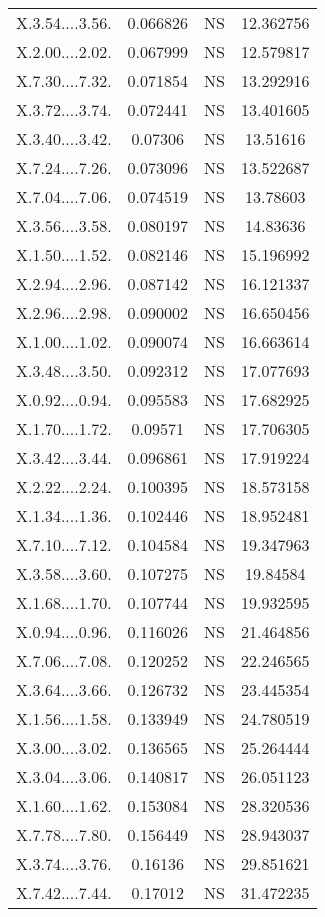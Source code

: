\documentclass[]{article}
\begin{document}
\begin{longtable}{ c c c c }
X.3.54....3.56. & 0.066826 & NS & 12.362756\\
X.2.00....2.02. & 0.067999 & NS & 12.579817\\
X.7.30....7.32. & 0.071854 & NS & 13.292916\\
X.3.72....3.74. & 0.072441 & NS & 13.401605\\
X.3.40....3.42. & 0.07306 & NS & 13.51616\\
X.7.24....7.26. & 0.073096 & NS & 13.522687\\
X.7.04....7.06. & 0.074519 & NS & 13.78603\\
X.3.56....3.58. & 0.080197 & NS & 14.83636\\
X.1.50....1.52. & 0.082146 & NS & 15.196992\\
X.2.94....2.96. & 0.087142 & NS & 16.121337\\
X.2.96....2.98. & 0.090002 & NS & 16.650456\\
X.1.00....1.02. & 0.090074 & NS & 16.663614\\
X.3.48....3.50. & 0.092312 & NS & 17.077693\\
X.0.92....0.94. & 0.095583 & NS & 17.682925\\
X.1.70....1.72. & 0.09571 & NS & 17.706305\\
X.3.42....3.44. & 0.096861 & NS & 17.919224\\
X.2.22....2.24. & 0.100395 & NS & 18.573158\\
X.1.34....1.36. & 0.102446 & NS & 18.952481\\
X.7.10....7.12. & 0.104584 & NS & 19.347963\\
X.3.58....3.60. & 0.107275 & NS & 19.84584\\
X.1.68....1.70. & 0.107744 & NS & 19.932595\\
X.0.94....0.96. & 0.116026 & NS & 21.464856\\
X.7.06....7.08. & 0.120252 & NS & 22.246565\\
X.3.64....3.66. & 0.126732 & NS & 23.445354\\
X.1.56....1.58. & 0.133949 & NS & 24.780519\\
X.3.00....3.02. & 0.136565 & NS & 25.264444\\
X.3.04....3.06. & 0.140817 & NS & 26.051123\\
X.1.60....1.62. & 0.153084 & NS & 28.320536\\
X.7.78....7.80. & 0.156449 & NS & 28.943037\\
X.3.74....3.76. & 0.16136 & NS & 29.851621\\
X.7.42....7.44. & 0.17012 & NS & 31.472235\\

\end{longtable}
\end{document}
